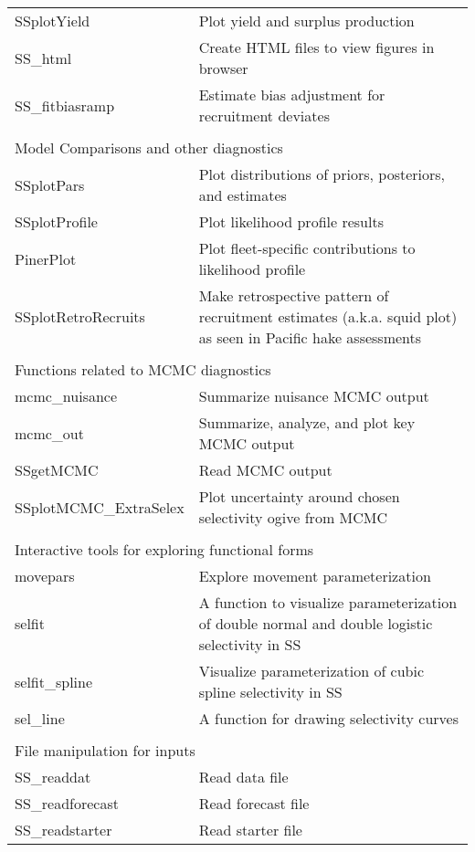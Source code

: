 \begin{center}
\begin{longtable}{p{4.5cm} p{10.52cm}}
		SSplotYield   & Plot yield and surplus production \\
		SS\_html       & Create HTML files to view figures in browser \\
		SS\_fitbiasramp & Estimate bias adjustment for recruitment deviates \\
		\hline
		\\
		\multicolumn{2}{l}{Model Comparisons and other diagnostics} \\
		\hline
		SSplotPars    & Plot distributions of priors, posteriors, and estimates \\
		SSplotProfile & Plot likelihood profile results \\
		PinerPlot     & Plot fleet-specific contributions to likelihood profile \\
		SSplotRetroRecruits & Make retrospective pattern of recruitment estimates (a.k.a. squid plot) as seen in Pacific hake assessments \\
		\hline
		\\
		\multicolumn{2}{l}{Functions related to MCMC diagnostics}\\
		\hline
		mcmc\_nuisance & Summarize nuisance MCMC output \\
		mcmc\_out      & Summarize, analyze, and plot key MCMC output \\
		SSgetMCMC      & Read MCMC output \\
		SSplotMCMC\_ExtraSelex & Plot uncertainty around chosen selectivity ogive from MCMC \\
		\hline
		\\
		\multicolumn{2}{l}{Interactive tools for exploring functional forms} \\
		\hline
		movepars      & Explore movement parameterization \\
		selfit        & A function to visualize parameterization of double normal and double logistic selectivity in SS \\
		selfit\_spline & Visualize parameterization of cubic spline selectivity in SS \\
		sel\_line     & A function for drawing selectivity curves \\
		\hline
		\\
		\multicolumn{2}{l}{File manipulation for inputs}\\
		\hline
		SS\_readdat   & Read data file \\
		SS\_readforecast & Read forecast file \\
		SS\_readstarter  & Read starter file \\

\end{longtable}
\end{center}
